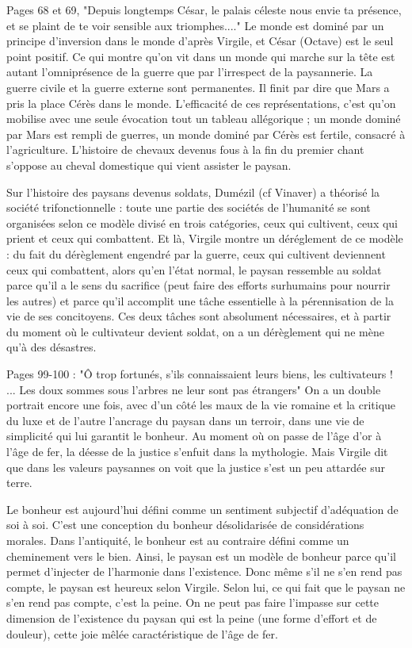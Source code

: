 \documentclass[a4paper,12pt]{book}
\begin{document}
\par Pages 68 et 69, "Depuis longtemps César, le palais céleste nous envie ta présence, et se plaint de te voir sensible aux triomphes...." Le monde est dominé par un principe d'inversion dans le monde d'après Virgile, et César (Octave) est le seul point positif. Ce qui montre qu'on vit dans un monde qui marche sur la tête est autant l'omniprésence de la guerre que par l'irrespect de la paysannerie. La guerre civile et la guerre externe sont permanentes. Il finit par dire que Mars a pris la place Cérès dans le monde. L'efficacité de ces représentations, c'est qu'on mobilise avec une seule évocation tout un tableau allégorique ; un monde dominé par Mars est rempli de guerres, un monde dominé par Cérès est fertile, consacré à l'agriculture. L'histoire de chevaux devenus fous à la fin du premier chant s'oppose au cheval domestique qui vient assister le paysan.
\par Sur l'histoire des paysans devenus soldats, Dumézil (cf Vinaver) a théorisé la société trifonctionnelle : toute une partie des sociétés de l'humanité se sont organisées selon ce modèle divisé en trois catégories, ceux qui cultivent, ceux qui prient et ceux qui combattent. Et là, Virgile montre un déréglement de ce modèle : du fait du dérèglement engendré par la guerre, ceux qui cultivent deviennent ceux qui combattent, alors qu'en l'état normal, le paysan ressemble au soldat parce qu'il a le sens du sacrifice (peut faire des efforts surhumains pour nourrir les autres) et parce qu'il accomplit une tâche essentielle à la pérennisation de la vie de ses concitoyens. Ces deux tâches sont absolument nécessaires, et à partir du moment où le cultivateur devient soldat, on a un dérèglement qui ne mène qu'à des désastres.
\par Pages 99-100 : "Ô trop fortunés, s'ils connaissaient leurs biens, les cultivateurs ! ... Les doux sommes sous l'arbres ne leur sont pas étrangers" On a un double portrait encore une fois, avec d'un côté les maux de la vie romaine et la critique du luxe et de l'autre l'ancrage du paysan dans un terroir, dans une vie de simplicité qui lui garantit le bonheur. Au moment où on passe de l'âge d'or à l'âge de fer, la déesse de la justice s'enfuit dans la mythologie. Mais Virgile dit que dans les valeurs paysannes on voit que la justice s'est un peu attardée sur terre.
\par Le bonheur est aujourd'hui défini comme un sentiment subjectif d'adéquation de soi à soi. C'est une conception du bonheur désolidarisée de considérations morales. Dans l'antiquité, le bonheur est au contraire défini comme un cheminement vers le bien. Ainsi, le paysan est un modèle de bonheur parce qu'il permet d'injecter de l'harmonie dans l'existence. Donc même s'il ne s'en rend pas compte, le paysan est heureux selon Virgile. Selon lui, ce qui fait que le paysan ne s'en rend pas compte, c'est la peine. On ne peut pas faire l'impasse sur cette dimension de l'existence du paysan qui est la peine (une forme d'effort et de douleur), cette joie mêlée caractéristique de l'âge de fer.
\end{document}
